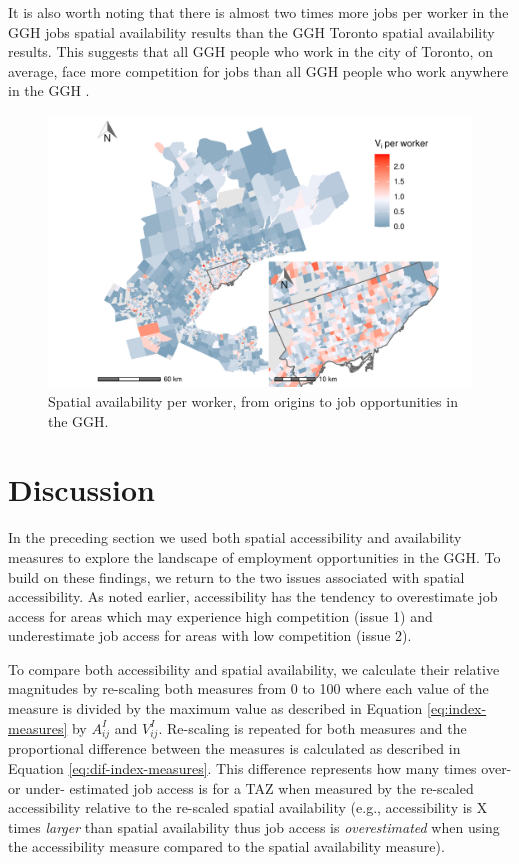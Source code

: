 \documentclass[]{elsarticle} %
\begin{document}
It is also worth noting that there is almost two times more jobs per
worker in the GGH jobs spatial availability results than the GGH Toronto
spatial availability results. This suggests that all GGH people who work
in the city of Toronto, on average, face more competition for jobs than
all GGH people who work anywhere in the GGH .

\begin{figure}
\includegraphics[width=1\linewidth]{Spatial-Availability_files/figure-latex/plot-avail-GGH-TTS-per-worker-1} \caption{\label{fig:plot-avail-GGH-TTS-per-worker}Spatial availability per worker, from origins to job opportunities in the GGH.}\label{fig:plot-avail-GGH-TTS-per-worker}
\end{figure}

\newpage

\hypertarget{discussion}{%
\section{Discussion}\label{discussion}}

In the preceding section we used both spatial accessibility and
availability measures to explore the landscape of employment
opportunities in the GGH. To build on these findings, we return to the
two issues associated with spatial accessibility. As noted earlier,
accessibility has the tendency to overestimate job access for areas
which may experience high competition (issue 1) and underestimate job
access for areas with low competition (issue 2).

To compare both accessibility and spatial availability, we calculate
their relative magnitudes by re-scaling both measures from 0 to 100
where each value of the measure is divided by the maximum value as
described in Equation \ref{eq:index-measures} by \(A^I_{ij}\) and
\(V^I_{ij}\). Re-scaling is repeated for both measures and the
proportional difference between the measures is calculated as described
in Equation \ref{eq:dif-index-measures}. This difference represents how
many times over- or under- estimated job access is for a TAZ when
measured by the re-scaled accessibility relative to the re-scaled
spatial availability (e.g., accessibility is X times \emph{larger} than
spatial availability thus job access is \emph{overestimated} when using
the accessibility measure compared to the spatial availability measure).
\end{document}
